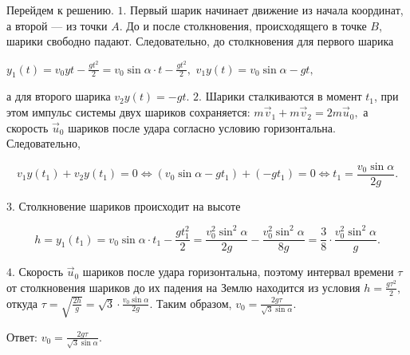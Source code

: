 \documentclass[12pt,a4paper]{article}
\begin{document}
{Перейдем к решению.
$1$.  Первый шарик начинает движение из начала координат, а второй  — из точки $A$. До и после столкновения, происходящего в точке $B$, шарики свободно падают. Следовательно, до столкновения для первого шарика

$y_1 ( t ) = v _0y t - \frac{gt ^2}{2} = v _0 \sin \alpha \cdot t - \frac{gt ^2}{2} ,$ 
$v _1y ( t ) = v _0 \sin \alpha - gt,$

а для второго шарика $v _2y ( t ) = - gt.$
$2$.  Шарики сталкиваются в момент $t_{1}$, при этом импульс системы двух шариков сохраняется: $m \vec v _1 + m \vec v _2 = 2m \vec u_0,$ а скорость $\vec u_0$ шариков после удара согласно условию горизонтальна. Следовательно,

\[v _1y ( t_1 ) + v _2y ( t_1 ) = 0 \Longleftrightarrow ( v _0 \sin \alpha - gt_1 ) + ( - gt_1 ) = 0 \Longleftrightarrow t_1 = \frac{v _0 \sin \alpha}{2g} .\]

$3$.  Столкновение шариков происходит на высоте

\[h = y_1 ( t_1 ) = v _0 \sin \alpha \cdot t_1 - \frac{gt_1 ^2}{2} = \frac{v _0 ^2 \sin ^2 \alpha}{2g} - \frac{v _0 ^2 \sin ^2 \alpha}{8g} = \frac{3}{8} \cdot \frac{v _0 ^2 \sin ^2 \alpha}{g} .\]

$4$.  Скорость $\vec u_0$ шариков после удара горизонтальна, поэтому интервал времени $\tau$ от столкновения шариков до их падения на Землю находится из условия $h = \frac{g \tau ^2}{2} ,$ откуда $\tau = \sqrt{\frac{2h}{g}} = \sqrt{3} \cdot \frac{v _0 \sin \alpha}{2g} .$ Таким образом, $v _0 = \frac{2g \tau}{\sqrt{3} \sin \alpha} .$

Ответ: $v _0 = \frac{2g \tau}{\sqrt{3} \sin \alpha} .$
}
\end{document}
